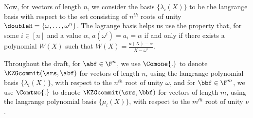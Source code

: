 Now, for vectors of length $n$, we consider the basis $\{\lambda_i(X)\}$ to be the langrange basis with respect to the set consisting of $n^{th}$ roots of unity $\doubleH=\{\omega,\ldots,\omega^n\}$. The lagrange basis helps us use the property that, for some $i\in [n]$ and a value $\alpha$, $a(\omega^i)=a_i=\alpha$ if and only if there exists a polynomial $W(X)$ such that $W(X)=\frac{a(X)-\alpha}{X-\omega^i}$. 

Throughout the draft, for $\abf\in \F^n$, we use $\Comone{.}$ to denote $\KZGcommit(\srs,\abf)$ for vectors of length $n$, using the langrange polynomial basis $\{\lambda_i(X)\}$, with respect to the $n^{th}$ root of unity $\omega$, and for $\bbf \in \F^m$, we use $\Comtwo{.}$ to denote $\KZGcommit(\srs,\bbf)$ for vectors of length $m$, using the langrange polynomial basis $\{\mu_i(X)\}$, with respect to the $m^{th}$ root of unity $\nu$.